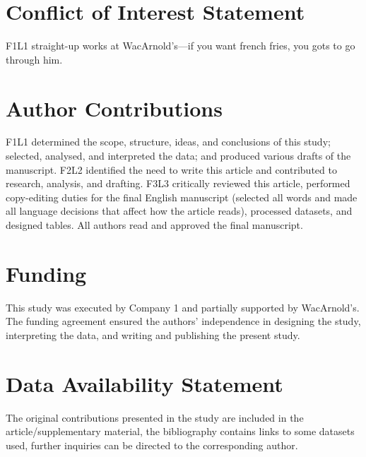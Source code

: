 \documentclass[utf8]{my_class_1_front_vanc}  %
\begin{document}
\section*{Conflict of Interest Statement}

F1L1 straight-up works at WacArnold's---if you want french fries, you gots to go through him.

\section*{Author Contributions}

F1L1 determined the scope, structure, ideas, and conclusions of this study; selected, analysed, and
interpreted the data; and produced various drafts of the manuscript. F2L2 identified the need to
write this article and contributed to research, analysis, and drafting. F3L3 critically reviewed
this article, performed copy-editing duties for the final English manuscript (selected all words
and made all language decisions that affect how the article reads), processed datasets, and
designed tables. All authors read and approved the final manuscript.

\section*{Funding}

This study was executed by Company 1 and partially supported by WacArnold's. 
The funding agreement ensured the authors' independence in designing the study, interpreting the
data, and writing and publishing the present study.



\section*{Data Availability Statement}

The original contributions presented in the study are included in the article/supplementary
material, the bibliography contains links to some datasets used, further inquiries can be directed
to the corresponding author.
\end{document}
